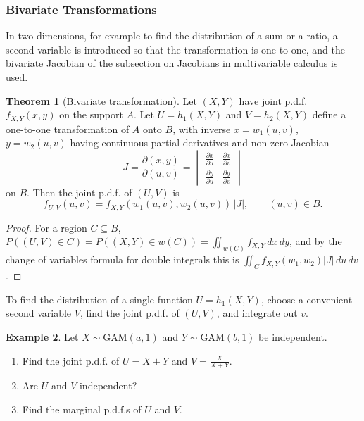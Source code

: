 \documentclass[12pt,a4paper]{report}
\theoremstyle{definition}
\newtheorem{thm}{Theorem}[section]
\newtheorem{example}[thm]{Example}
\theoremstyle{plain}
\begin{document}
\subsubsection{Bivariate Transformations}

In two dimensions, for example to find the distribution of a sum or a ratio, a
second variable is introduced so that the transformation is one to one, and the
bivariate Jacobian of the subsection on Jacobians in multivariable calculus is
used.

\begin{thm}[Bivariate transformation]
\label{thm:transbivariate}
Let $(X, Y)$ have joint p.d.f. $f_{X,Y}(x,y)$ on the support $A$. Let
$U = h_1(X,Y)$ and $V = h_2(X,Y)$ define a one-to-one transformation of $A$ onto
$B$, with inverse $x = w_1(u,v)$, $y = w_2(u,v)$ having continuous partial
derivatives and non-zero Jacobian
\[ J = \frac{\partial(x,y)}{\partial(u,v)} = \begin{vmatrix} \frac{\partial
x}{\partial u} & \frac{\partial x}{\partial v} \\[1ex] \frac{\partial y}{\partial
u} & \frac{\partial y}{\partial v} \end{vmatrix}\]
on $B$. Then the joint p.d.f. of $(U, V)$ is
\[ f_{U,V}(u,v) = f_{X,Y}(w_1(u,v), w_2(u,v))\,|J| ,\qquad (u,v)\in B .\]
\end{thm}

\begin{proof}
For a region $C\subseteq B$, $P((U,V)\in C) = P((X,Y)\in w(C)) =
\iint_{w(C)}f_{X,Y}\,dx\,dy$, and by the change of variables formula for double
integrals this is $\iint_C f_{X,Y}(w_1,w_2)|J|\,du\,dv$.
\end{proof}

To find the distribution of a single function $U = h_1(X,Y)$, choose a
convenient second variable $V$, find the joint p.d.f. of $(U,V)$, and integrate
out $v$.

\begin{example}
\label{ex:gammabeta}
Let $X\sim\text{GAM}(a,1)$ and $Y\sim\text{GAM}(b,1)$ be independent.
\begin{enumerate}
\item[(i)] Find the joint p.d.f. of $U = X + Y$ and $V = \frac{X}{X + Y}$.
\item[(ii)] Are $U$ and $V$ independent?
\item[(iii)] Find the marginal p.d.f.s of $U$ and $V$.
\end{enumerate}
\end{example}
\end{document}
